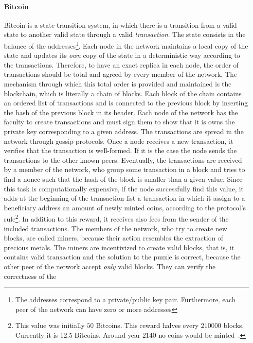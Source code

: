 \paragraph{Bitcoin}
Bitcoin is a state transition system, in which there is a transition from
a valid state to another valid state through a valid \emph{transaction}. The
state consists in the balance of the addresses\footnote{The addresses 
correspond to a private/public key pair. Furthermore, each peer of the 
network can have zero or more addresses}. Each node in the network maintains a
local copy of the state and updates its \emph{own} copy of the state in a 
deterministic way according to the transactions. Therefore, to have an exact 
replica in each node, the order of transactions should be total and agreed by 
every member of the network. The mechanism through which this total order is
provided and maintained is the blockchain, which is literally a chain of
blocks. Each block of the chain contains an ordered list of transactions and is 
connected to the previous block by inserting the hash of the previous block in 
its header. Each node of the network has the faculty to create transactions and
must sign them to show that it is owns the private key corresponding to a given
address. The transactions are spread in the network through gossip protocols. 
Once a node receives a new transaction, it verifies that the transaction is
well-formed. If it is the case the node sends the transactions to the 
other known peers. Eventually, the transactions are received by a member of the 
network, who group some transaction in a block and tries to find a nonce such 
that the hash of the block is smaller than a given value. Since this task is 
computationally expensive, if the node successfully find this value, it adds at 
the beginning of the transaction list a transaction in which it assign to a 
beneficiary address an amount of newly minted coins, according to the 
protocol's rule\footnote{This value was initially $50$ Bitcoins. This reward 
halves every $210000$ blocks. Currently it is 12.5 Bitcoins. Around year $2140$ 
no coins would be minted~\cite{bib:masteringbitcoin}.}. In addition to this
reward, it receives also fees from the sender of the included transactions. The 
members of the network, who try to create new blocks, are called miners, 
because their action resembles the extraction of precious metals. The miners 
are incentivized to create valid blocks, that is, it contains valid transaction 
and the solution  to the puzzle  is correct, because the other peer of the 
network accept \emph{only} valid blocks. They can verify the correctness of the 
